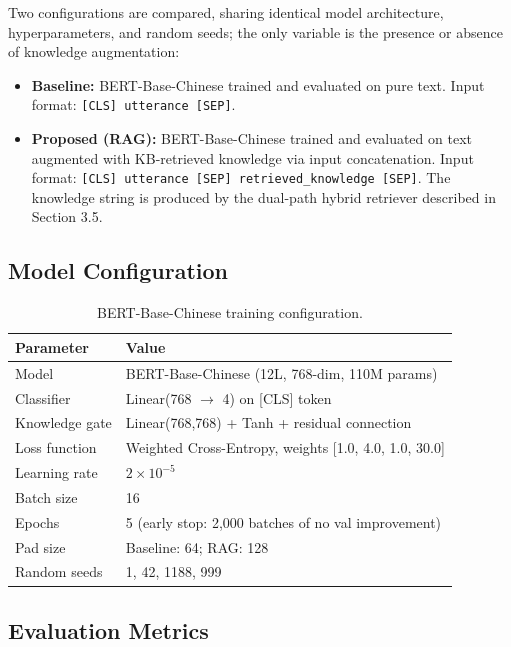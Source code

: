 \documentclass[conference]{IEEEtran}
\begin{document}
Two configurations are compared, sharing identical model architecture,
hyperparameters, and random seeds; the only variable is the presence or absence
of knowledge augmentation:

\begin{itemize}[leftmargin=*]
    \item \textbf{Baseline:} BERT-Base-Chinese trained and evaluated on pure text.
    Input format: \texttt{[CLS] utterance [SEP]}.
    \item \textbf{Proposed (RAG):} BERT-Base-Chinese trained and evaluated on
    text augmented with KB-retrieved knowledge via input concatenation.
    Input format: \texttt{[CLS] utterance [SEP] retrieved\_knowledge [SEP]}.
    The knowledge string is produced by the dual-path hybrid retriever described
    in Section 3.5.
\end{itemize}

\subsection{Model Configuration}

\begin{table}[H]
\centering
\caption{BERT-Base-Chinese training configuration.}
\label{tab:config}
\begin{tabular}{ll}
\toprule
\textbf{Parameter} & \textbf{Value} \\
\midrule
Model & BERT-Base-Chinese (12L, 768-dim, 110M params) \\
Classifier & Linear(768 $\rightarrow$ 4) on [CLS] token \\
Knowledge gate & Linear(768,768) + Tanh + residual connection \\
Loss function & Weighted Cross-Entropy, weights [1.0, 4.0, 1.0, 30.0] \\
Learning rate & $2\times10^{-5}$ \\
Batch size & 16 \\
Epochs & 5 (early stop: 2,000 batches of no val improvement) \\
Pad size & Baseline: 64; RAG: 128 \\
Random seeds & 1, 42, 1188, 999 \\
\bottomrule
\end{tabular}
\end{table}

\subsection{Evaluation Metrics}
\end{document}
